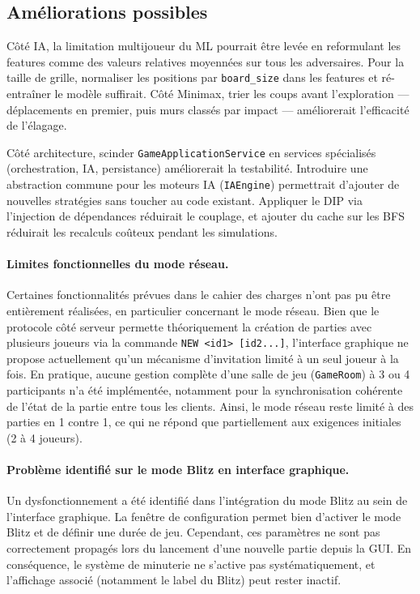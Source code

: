 \documentclass[a4paper]{article}
\begin{document}
\subsection*{Améliorations possibles}

Côté IA, la limitation multijoueur du ML pourrait être levée en reformulant
les features comme des valeurs relatives moyennées sur tous les adversaires.
Pour la taille de grille, normaliser les positions par \texttt{board\_size}
dans les features et ré-entraîner le modèle suffirait. Côté Minimax, trier
les coups avant l’exploration — déplacements en premier, puis murs classés
par impact — améliorerait l’efficacité de l’élagage.

Côté architecture, scinder \texttt{GameApplicationService} en services
spécialisés (orchestration, IA, persistance) améliorerait la testabilité.
Introduire une abstraction commune pour les moteurs IA (\texttt{IAEngine})
permettrait d’ajouter de nouvelles stratégies sans toucher au code existant.
Appliquer le DIP via l’injection de dépendances réduirait le couplage, et
ajouter du cache sur les BFS réduirait les recalculs coûteux pendant les
simulations.

\paragraph{Limites fonctionnelles du mode réseau.}
Certaines fonctionnalités prévues dans le cahier des charges n’ont pas pu être
entièrement réalisées, en particulier concernant le mode réseau. Bien que le
protocole côté serveur permette théoriquement la création de parties avec
plusieurs joueurs via la commande \texttt{NEW <id1> [id2...]}, l’interface
graphique ne propose actuellement qu’un mécanisme d’invitation limité à un seul
joueur à la fois. En pratique, aucune gestion complète d’une salle de jeu
(\texttt{GameRoom}) à 3 ou 4 participants n’a été implémentée, notamment pour
la synchronisation cohérente de l’état de la partie entre tous les clients.
Ainsi, le mode réseau reste limité à des parties en 1 contre 1, ce qui ne
répond que partiellement aux exigences initiales (2 à 4 joueurs).

\paragraph{Problème identifié sur le mode Blitz en interface graphique.}
Un dysfonctionnement a été identifié dans l’intégration du mode Blitz au sein
de l’interface graphique. La fenêtre de configuration permet bien d’activer le
mode Blitz et de définir une durée de jeu. Cependant, ces paramètres ne sont
pas correctement propagés lors du lancement d’une nouvelle partie depuis la GUI.
En conséquence, le système de minuterie ne s’active pas systématiquement, et
l’affichage associé (notamment le label du Blitz) peut rester inactif.
\end{document}
